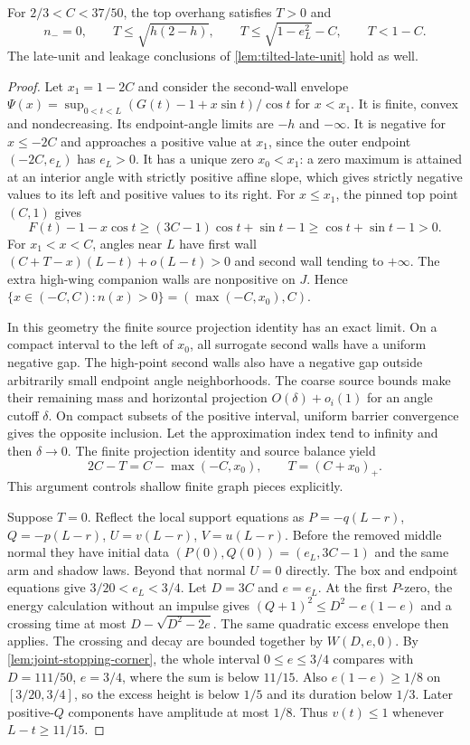 \begin{lemma}\label{lem:tilted-dry-endpoint}
For $2/3<C<37/50$, the top overhang satisfies $T>0$ and
\[
 n_-=0,\qquad T\le\sqrt{h(2-h)},\qquad
 T\le\sqrt{1-e_L^2}-C,\qquad T<1-C.
\]
The late-unit and leakage conclusions of
\cref{lem:tilted-late-unit} hold as well.
\end{lemma}
\begin{proof}
Let $x_1=1-2C$ and consider the second-wall envelope
$\Psi(x)=\sup_{0<t<L}(G(t)-1+x\sin t)/\cos t$ for $x<x_1$.
It is finite, convex and nondecreasing. Its endpoint-angle limits
are $-h$ and $-\infty$. It is negative for $x\le-2C$ and
approaches a positive value at $x_1$, since the outer endpoint
$(-2C,e_L)$ has $e_L>0$.
It has a unique zero $x_0<x_1$: a zero maximum is attained at
an interior angle with strictly positive affine slope, which gives
strictly negative values to its left and positive values to its right.
For $x\le x_1$, the pinned top point $(C,1)$ gives
\[
 F(t)-1-x\cos t\ge(3C-1)\cos t+\sin t-1
             \ge\cos t+\sin t-1>0.
\]
For $x_1<x<C$, angles near $L$ have first wall
$(C+T-x)(L-t)+o(L-t)>0$ and second wall tending to $+\infty$.
The extra high-wing companion walls are nonpositive on $J$.
Hence $\{x\in(-C,C):n(x)>0\}=(\max(-C,x_0),C)$.

In this geometry the finite source projection identity has an exact
limit. On a compact interval to the left of $x_0$, all surrogate
second walls have a uniform negative gap. The high-point second
walls also have a negative gap outside arbitrarily small endpoint
angle neighborhoods. The coarse source bounds make their remaining
mass and horizontal projection $O(\delta)+o_i(1)$ for an angle
cutoff $\delta$. On compact subsets of the positive interval,
uniform barrier convergence gives the opposite inclusion.
Let the approximation index tend to infinity and then $\delta\to0$.
The finite projection identity and source balance yield
\[
 2C-T=C-\max(-C,x_0),\qquad T=(C+x_0)_+.
\]
This argument controls shallow finite graph pieces explicitly.

Suppose $T=0$. Reflect the local support equations as
$P=-q(L-r)$, $Q=-p(L-r)$, $U=v(L-r)$, $V=u(L-r)$.
Before the removed middle normal they have initial data
$(P(0),Q(0))=(e_L,3C-1)$ and the same arm and shadow laws.
Beyond that normal $U=0$ directly.
The box and endpoint equations give $3/20<e_L<3/4$.
Let $D=3C$ and $e=e_L$.
At the first $P$-zero, the energy calculation without an impulse
gives $(Q+1)^2\le D^2-e(1-e)$ and a crossing time at most
$D-\sqrt{D^2-2e}$.
The same quadratic excess envelope then applies.
The crossing and decay are bounded together by $W(D,e,0)$.
By \cref{lem:joint-stopping-corner}, the whole interval $0\le e\le3/4$
compares with $D=111/50$, $e=3/4$, where the sum is below $11/15$.
Also $e(1-e)\ge1/8$ on $[3/20,3/4]$, so the excess height
is below $1/5$ and its duration below $1/3$.
Later positive-$Q$ components have amplitude at most $1/8$.
Thus $v(t)\le1$ whenever $L-t\ge11/15$.


\end{proof}
